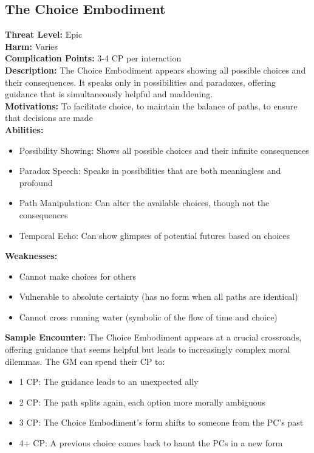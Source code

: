 \documentclass[11pt]{article}
\newenvironment{monsterentry}[1]{%
  \begin{mdframed}[backgroundcolor=shadecolor, linewidth=0pt, leftmargin=0pt, rightmargin=0pt]%
  \subsection*{#1}%
}{%
  \end{mdframed}%
}
\begin{document}
\begin{monsterentry}{The Choice Embodiment}
\textbf{Threat Level:} Epic \\
\textbf{Harm:} Varies \\
\textbf{Complication Points:} 3-4 CP per interaction \\
\textbf{Description:} The Choice Embodiment appears showing all possible choices and their consequences. It speaks only in possibilities and paradoxes, offering guidance that is simultaneously helpful and maddening. \\
\textbf{Motivations:} To facilitate choice, to maintain the balance of paths, to ensure that decisions are made \\
\textbf{Abilities:}
\begin{itemize}
    \item Possibility Showing: Shows all possible choices and their infinite consequences
    \item Paradox Speech: Speaks in possibilities that are both meaningless and profound
    \item Path Manipulation: Can alter the available choices, though not the consequences
    \item Temporal Echo: Can show glimpses of potential futures based on choices
\end{itemize}
\textbf{Weaknesses:}
\begin{itemize}
    \item Cannot make choices for others
    \item Vulnerable to absolute certainty (has no form when all paths are identical)
    \item Cannot cross running water (symbolic of the flow of time and choice)
\end{itemize}
\textbf{Sample Encounter:} The Choice Embodiment appears at a crucial crossroads, offering guidance that seems helpful but leads to increasingly complex moral dilemmas. The GM can spend their CP to:
\begin{itemize}
    \item 1 CP: The guidance leads to an unexpected ally
    \item 2 CP: The path splits again, each option more morally ambiguous
    \item 3 CP: The Choice Embodiment's form shifts to someone from the PC's past
    \item 4+ CP: A previous choice comes back to haunt the PCs in a new form
\end{itemize}
\end{monsterentry}
\end{document}
